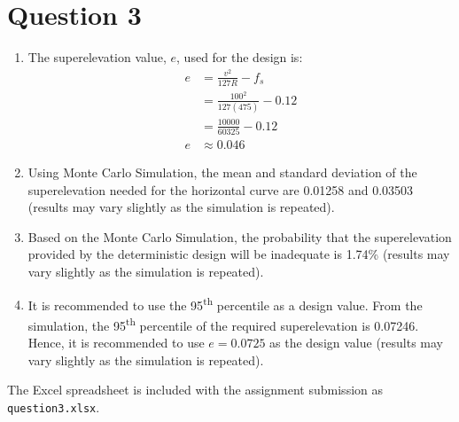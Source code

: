 \section*{Question 3}
\begin{enumerate}[label=(\alph*)]
\item 
The superelevation value, $e$, used for the design is:
\begin{align*}
	e &= \frac{v^2}{127R} - f_s \\
	&= \frac{100^2}{127(475)} - 0.12 \\
	&= \frac{10000}{60325} - 0.12 \\
	e &\approx 0.046
\end{align*}

\item 
Using Monte Carlo Simulation, the mean and standard deviation of the superelevation needed for the horizontal curve are 0.01258 and 0.03503 (results may vary slightly as the simulation is repeated).

\item
Based on the Monte Carlo Simulation, the probability that the superelevation provided by the deterministic design will be inadequate is 1.74\% (results may vary slightly as the simulation is repeated).

\item
It is recommended to use the 95\textsuperscript{th} percentile as a design value. From the simulation, the 95\textsuperscript{th} percentile of the required superelevation is 0.07246. Hence, it is recommended to use $e = 0.0725$ as the design value (results may vary slightly as the simulation is repeated).
\end{enumerate}

The Excel spreadsheet is included with the assignment submission as \texttt{question3.xlsx}.